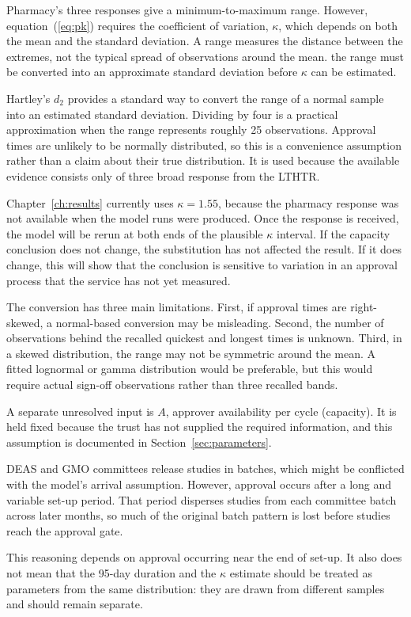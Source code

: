 Pharmacy's three responses give a minimum-to-maximum range. However, equation~(\ref{eq:pk}) requires the coefficient of variation, $\kappa$, which depends on both the mean and the standard deviation. A range measures the distance between the extremes, not the typical spread of observations around the mean. the range must be converted into an approximate standard deviation before $\kappa$ can be estimated.

Hartley's $d_2$ provides a standard way to convert the range of a normal sample into an estimated standard deviation. Dividing by four is a practical approximation when the range represents roughly 25 observations. Approval times are unlikely to be normally distributed, so this is a convenience assumption rather than a claim about their true distribution. It is used because the available evidence consists only of three broad response from the LTHTR.

Chapter~\ref{ch:results} currently uses $\kappa = 1.55$, because the pharmacy response was not available when the model runs were produced. Once the response is received, the model will be rerun at both ends of the plausible $\kappa$ interval. If the capacity conclusion does not change, the substitution has not affected the result. If it does change, this will show that the conclusion is sensitive to variation in an approval process that the service has not yet measured.

The conversion has three main limitations. First, if approval times are right-skewed, a normal-based conversion may be misleading. Second, the number of observations behind the recalled quickest and longest times is unknown. Third, in a skewed distribution, the range may not be symmetric around the mean. A fitted lognormal or gamma distribution would be preferable, but this would require actual sign-off observations rather than three recalled bands.

A separate unresolved input is $A$, approver availability per cycle (capacity). It is held fixed because the trust has not supplied the required information, and this assumption is documented in Section~\ref{sec:parameters}.

DEAS and GMO committees release studies in batches, which might be conflicted with the model's arrival assumption. However, approval occurs after a long and variable set-up period. That period disperses studies from each committee batch across later months, so much of the original batch pattern is lost before studies reach the approval gate.

This reasoning depends on approval occurring near the end of set-up. It also does not mean that the 95-day duration and the $\kappa$ estimate should be treated as parameters from the same distribution: they are drawn from different samples and should remain separate.
